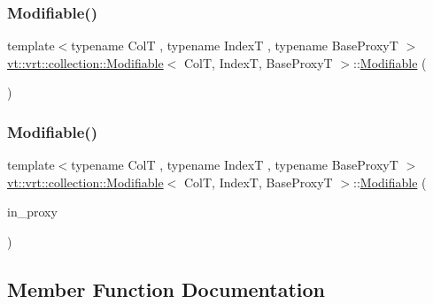 \subsubsection{\texorpdfstring{Modifiable()}{Modifiable()}\hspace{0.1cm}{\footnotesize\ttfamily [3/4]}}
{\footnotesize\ttfamily template$<$typename ColT , typename IndexT , typename Base\+ProxyT $>$ \\
\hyperlink{structvt_1_1vrt_1_1collection_1_1_modifiable}{vt\+::vrt\+::collection\+::\+Modifiable}$<$ ColT, IndexT, Base\+ProxyT $>$\+::\hyperlink{structvt_1_1vrt_1_1collection_1_1_modifiable}{Modifiable} (\begin{DoxyParamCaption}\item[{\hyperlink{structvt_1_1vrt_1_1collection_1_1_modifiable}{Modifiable}$<$ ColT, IndexT, Base\+ProxyT $>$ \&\&}]{ }\end{DoxyParamCaption})\hspace{0.3cm}{\ttfamily [default]}}

\mbox{\label{structvt_1_1vrt_1_1collection_1_1_modifiable_a33012fc2dfcbebfc87ada0dd22b15085}} 
\subsubsection{\texorpdfstring{Modifiable()}{Modifiable()}\hspace{0.1cm}{\footnotesize\ttfamily [4/4]}}
{\footnotesize\ttfamily template$<$typename ColT , typename IndexT , typename Base\+ProxyT $>$ \\
\hyperlink{structvt_1_1vrt_1_1collection_1_1_modifiable}{vt\+::vrt\+::collection\+::\+Modifiable}$<$ ColT, IndexT, Base\+ProxyT $>$\+::\hyperlink{structvt_1_1vrt_1_1collection_1_1_modifiable}{Modifiable} (\begin{DoxyParamCaption}\item[{\hyperlink{namespacevt_a1b417dd5d684f045bb58a0ede70045ac}{Virtual\+Proxy\+Type} const}]{in\+\_\+proxy }\end{DoxyParamCaption})\hspace{0.3cm}{\ttfamily [explicit]}}



\subsection{Member Function Documentation}
\mbox{\label{structvt_1_1vrt_1_1collection_1_1_modifiable_af53b2012d58ed0f16ab9aa4a43f7716b}} 
